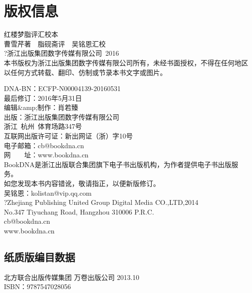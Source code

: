 \chapter{版权信息}

{红楼梦脂评汇校本}\\
曹雪芹著~~脂砚斋评~~吴铭恩汇校\\[2\baselineskip]?浙江出版集团数字传媒有限公司~2016\\
本书版权为浙江出版集团数字传媒有限公司所有，未经书面授权，不得在任何地区以任何方式转载、翻印、仿制或节录本书文字或图片。

DNA-BN：ECFP-N00004139-20160531\\
最后修订：2016年5月31日\\
编辑\&amp;制作：{肖若臻}\\

出版：浙江出版集团数字传媒有限公司\\
浙江~杭州~体育场路347号\\
互联网出版许可证：新出网证（浙）字10号\\
电子邮箱：cb@bookdna.cn\\
网　　址：www.bookdna.cn\\
BookDNA是浙江出版联合集团旗下电子书出版机构，为作者提供电子书出版服务。\\
如您发现本书内容错讹，敬请指正，以便新版修订。\\
吴铭恩：kolistan@vip.qq.com\\

?Zhejiang Publishing United Group Digital Media CO.,LTD,2014\\
No.347 Tiyuchang Road, Hangzhou 310006 P.R.C.\\
cb@bookdna.cn\\
www.bookdna.cn



\section{纸质版编目数据}

北方联合出版传媒集团 万卷出版公司 2013.10\\
ISBN：9787547028056
